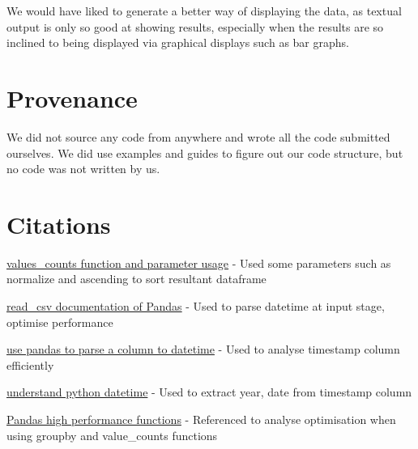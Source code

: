 \documentclass[12pt,a4paper,final]{article}
\begin{document}
We would have liked to generate a better way of displaying the data, as textual output is only so good at showing results, especially when the results are so inclined to being displayed via graphical displays such as bar graphs.

\section*{Provenance}

We did not source any code from anywhere and wrote all the code submitted ourselves. We did use examples and guides to figure out our code structure, but no code was not written by us.

\section*{Citations}

\noindent
\href{https://www.w3resource.com/pandas/series/series-value_counts.php}{values\_counts function and parameter usage}
\newline - Used some parameters such as normalize and ascending to sort resultant dataframe

\noindent
\href{https://pandas.pydata.org/pandas-docs/stable/reference/api/pandas.read_csv.html}{read\_csv documentation of Pandas}
\newline - Used to parse datetime at input stage, optimise performance

\noindent
\href{https://pandas.pydata.org/pandas-docs/stable/reference/api/pandas.to_datetime.html}{use pandas to parse a column to datetime}
\newline - Used to analyse timestamp column efficiently

\noindent
\href{https://docs.python.org/3/library/datetime.html} {understand python datetime}
\newline - Used to extract year, date from timestamp column

\noindent
\href{https://books.google.co.uk/books?id=LcHgDwAAQBAJ&pg=PT337&lpg=PT337&dq=pandas+value_counts+performance&source=bl&ots=bgNWdiwkVC&sig=ACfU3U0bGo5e7tdN6bztLRuGNm3EC1vI6Q&hl=en&sa=X&ved=2ahUKEwjzpMjT9JzpAhXDTxUIHXdJDBgQ6AEwBnoECAoQAQ#v=onepage&q=pandas%20value_counts%20performance&f=false} {Pandas high performance functions}
\newline - Referenced to analyse optimisation when using groupby and value\_counts functions
\end{document}
